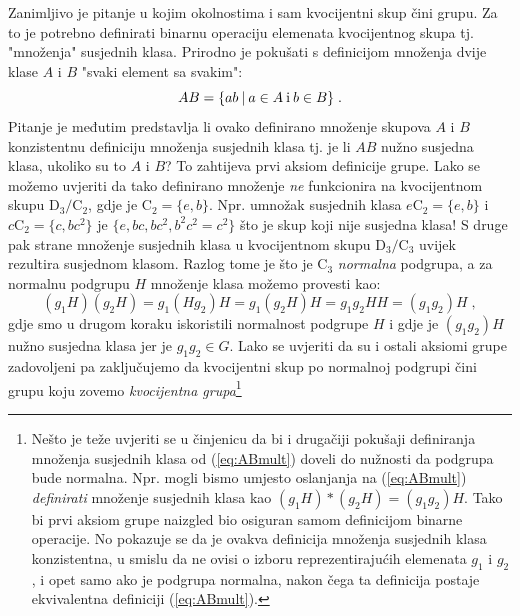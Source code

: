 Zanimljivo je pitanje u kojim okolnostima i sam kvocijentni skup čini grupu.
Za to je potrebno definirati binarnu operaciju elemenata kvocijentnog
skupa tj. "množenja" susjednih klasa.
Prirodno je pokušati s definicijom množenja dvije klase $A$ i 
$B$ "svaki element sa svakim":
\begin{equation}\label{eq:ABmult}
    A B =\{ab \: | \: a \in A \:\text{i}\: b \in B\} \;.
\end{equation}
Pitanje je međutim predstavlja li ovako definirano množenje skupova $A$ i $B$
konzistentnu definiciju množenja susjednih klasa tj. je li $AB$ nužno susjedna
klasa, ukoliko su to $A$ i $B$? To zahtijeva prvi aksiom definicije
grupe. Lako se možemo uvjeriti da tako definirano množenje \emph{ne} funkcionira
na kvocijentnom skupu $\mathrm{D}_3 / \mathrm{C}_2$, gdje je $\mathrm{C}_2 = \{e, b\}$.
Npr. umnožak susjednih klasa $e\mathrm{C}_2 = \{e, b\}$ i $c\mathrm{C}_2=\{c, bc^2\}$
je $\{e, bc, bc^2, b^2 c^2 = c^2\}$ što je skup koji nije susjedna klasa!
S druge pak strane množenje susjednih klasa u kvocijentnom skupu
$\mathrm{D}_3 / \mathrm{C}_3$ uvijek rezultira susjednom klasom. Razlog tome je
što je $\mathrm{C}_3$ \emph{normalna} podgrupa, a za normalnu podgrupu $H$ 
množenje klasa možemo provesti kao:
\begin{equation}
       (g_1H)(g_2H) = g_1 (H g_2) H = g_1 (g_2 H) H = g_1 g_2 H H
       = (g_1 g_2) H\;,
\end{equation}
gdje smo u drugom koraku iskoristili normalnost podgrupe $H$ i gdje je
$(g_1 g_2) H$ nužno susjedna klasa jer je $g_1 g_2 \in G$.
Lako se uvjeriti da su i ostali aksiomi grupe zadovoljeni pa zaključujemo
da kvocijentni skup po normalnoj podgrupi čini grupu koju zovemo
\emph{kvocijentna grupa}\footnote{Nešto je teže
    uvjeriti se u činjenicu da bi i drugačiji pokušaji definiranja množenja
    susjednih klasa od (\ref{eq:ABmult}) doveli do nužnosti da podgrupa
bude normalna. Npr. mogli bismo umjesto oslanjanja na (\ref{eq:ABmult}) 
\emph{definirati} množenje susjednih klasa kao $(g_1 H) \ast (g_2 H) = (g_1 g_2) H$.
Tako bi prvi aksiom grupe naizgled bio osiguran samom definicijom binarne operacije.
No pokazuje se da je ovakva definicija množenja susjednih klasa konzistentna, u smislu
da ne ovisi o izboru reprezentirajućih elemenata $g_1$ i $g_2$, i opet samo ako je
podgrupa normalna, nakon čega ta definicija postaje ekvivalentna definiciji (\ref{eq:ABmult}).}


